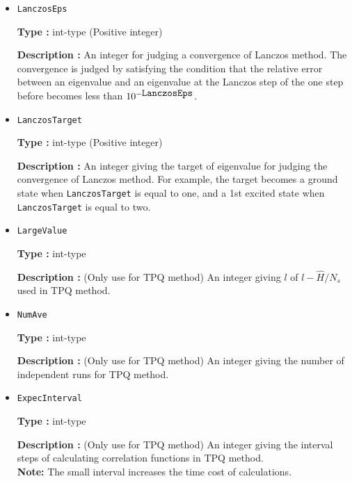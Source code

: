 \begin{itemize}
{\bf Description :} 
 An integer for setting the number of getting eigenvectors from the ground energy by Lanczos method.\\
{\bf Note}:  the following condition must be satisfied \verb|nvec| $>=$ \verb|exct|.

\item   \verb|LanczosEps|
   
{\bf Type :} int-type (Positive integer)

{\bf Description :} An integer for judging a convergence of Lanczos method. The convergence is judged by satisfying the condition that the relative error between an eigenvalue and an eigenvalue at the Lanczos step of the one step before becomes less than $10^{- \verb|LanczosEps|}$.

 \item  \verb|LanczosTarget| 
   
 {\bf Type :} int-type (Positive integer)

  {\bf Description :} An integer giving the target of eigenvalue for judging the convergence of Lanczos method. For example, the target becomes a ground state when \verb|LanczosTarget|  is equal to one, and a 1st excited state when  \verb|LanczosTarget|  is equal to two.
     
\item \verb|LargeValue|

{\bf Type :} int-type

{\bf Description :} (Only use for TPQ method) An integer giving $l$ of $l-\hat{H}/N_{s}$ used in TPQ method.
 
\item \verb|NumAve|

{\bf Type :} int-type

{\bf Description :} (Only use for TPQ method) An integer giving the number of independent runs for TPQ method. 

\item \verb|ExpecInterval|

{\bf Type :} int-type

{\bf Description :} (Only use for TPQ method) An integer giving the interval steps of calculating correlation functions in TPQ method.\\ 
{\bf Note:} The small interval increases the time cost of calculations.
 
 \end{itemize}


\newpage
